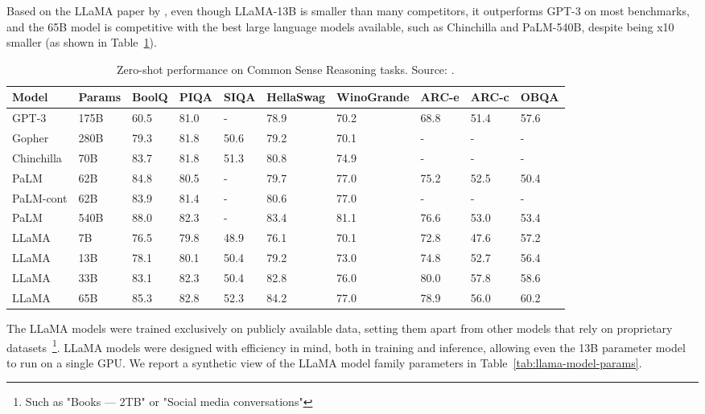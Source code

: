 Based on the LLaMA paper by \textcite{touvron2023llama}, even though LLaMA-13B is smaller than many competitors, it outperforms GPT-3 on most benchmarks, and the 65B model is competitive with the best large language models available, such as Chinchilla and PaLM-540B, despite being x10 smaller (as shown in Table~\ref{tab:llama-zero-shot-performance}).

\begin{table}[htbp]
	\centering
	\scriptsize
	\begin{tabularx}{\textwidth}{@{}lXXXXXXXXX@{}}
		\toprule
		Model      & Params & BoolQ & PIQA & SIQA & HellaSwag & WinoGrande & ARC-e & ARC-c & OBQA \\
		\midrule
		GPT-3      & 175B   & 60.5  & 81.0 & -    & 78.9      & 70.2       & 68.8  & 51.4  & 57.6 \\
		Gopher     & 280B   & 79.3  & 81.8 & 50.6 & 79.2      & 70.1       & -     & -     & -    \\
		Chinchilla & 70B    & 83.7  & 81.8 & 51.3 & 80.8      & 74.9       & -     & -     & -    \\
		PaLM       & 62B    & 84.8  & 80.5 & -    & 79.7      & 77.0       & 75.2  & 52.5  & 50.4 \\
		PaLM-cont  & 62B    & 83.9  & 81.4 & -    & 80.6      & 77.0       & -     & -     & -    \\
		PaLM       & 540B   & 88.0  & 82.3 & -    & 83.4      & 81.1       & 76.6  & 53.0  & 53.4 \\
		\addlinespace
		LLaMA      & 7B     & 76.5  & 79.8 & 48.9 & 76.1      & 70.1       & 72.8  & 47.6  & 57.2 \\
		LLaMA      & 13B    & 78.1  & 80.1 & 50.4 & 79.2      & 73.0       & 74.8  & 52.7  & 56.4 \\
		LLaMA      & 33B    & 83.1  & 82.3 & 50.4 & 82.8      & 76.0       & 80.0  & 57.8  & 58.6 \\
		LLaMA      & 65B    & 85.3  & 82.8 & 52.3 & 84.2      & 77.0       & 78.9  & 56.0  & 60.2 \\
		\bottomrule
	\end{tabularx}
	\caption{Zero-shot performance on Common Sense Reasoning tasks. Source: \protect\textcite{touvron2023llama}.}
	\label{tab:llama-zero-shot-performance}
\end{table}

The LLaMA models were trained exclusively on publicly available data, setting them apart from other models that rely on proprietary datasets~\footnote{Such as "Books --- 2TB" or "Social media conversations"}.
LLaMA models were designed with efficiency in mind, both in training and inference, allowing even the 13B parameter model to run on a single GPU\@.
We report a synthetic view of the LLaMA model family parameters in Table~\ref{tab:llama-model-params}.

